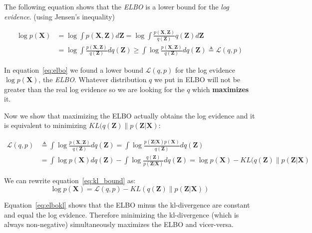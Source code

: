 \documentclass[11pt, a4paper]{report}
\theoremstyle{plain}
\theoremstyle{definition}
\theoremstyle{remark}
\newcommand{\bv}[1]{\boldsymbol{#1}}
\begin{document}
The following equation shows that the \emph{ELBO} is a lower bound for the \emph{log
evidence}.
(using Jensen's inequality)

\begin{equation}
\label{eq:elbo}
\begin{aligned}
\log p(\bv{X}) &= \log \int p(\bv{X},\bv{Z}) d\bv{Z} 
= \log \int \frac{p(\bv{X},\bv{Z})}{q(\bv{Z})} q(\bv{Z})d\bv{Z} \\
&= \log \int \frac{p(\bv{X},\bv{Z})}{q(\bv{Z})}dq(\bv{Z}) 
\geq \int \log \frac{p(\bv{X},\bv{Z})}{q(\bv{Z})}dq(\bv{Z}) 
\triangleq \mathcal{L}(q,p)
\end{aligned}
\end{equation}

In equation~\ref{eq:elbo} we found a lower bound $\mathcal{L}(q,p)$ for the log
evidence $\log p(\bv{X})$, the \emph{ELBO}.
Whatever distribution $q$ we put in ELBO will not be
greater than the real log evidence so we are looking for the $q$ which
\textbf{maximizes} it.

Now we show that maximizing the ELBO actually obtains the log evidence and it is
equivalent to minimizing $KL(q(\bv{Z}) \| p(\bv{Z}|\bv{X})$:

\begin{equation}\label{eq:kl_bound}
\begin{aligned}
\mathcal{L}(q,p) &\triangleq \int \log \frac{p(\bv{X},\bv{Z})}{q(\bv{Z})} d
q(\bv{Z})
= \int \log \frac{p(\bv{Z}|\bv{X})p(\bv{X})}{q(\bv{Z})} d q(\bv{Z}) \\
&= \int \log p(\bv{X}) dq(\bv{Z}) - \int \log \frac{q(\bv{Z})}{p(\bv{Z}|\bv{X})}
dq(\bv{Z}) 
= \log p(\bv{X}) - KL(q(\bv{Z}) \| p(\bv{Z}|\bv{X})
\end{aligned}
\end{equation}

We can rewrite equation~\ref{eq:kl_bound} as:
\begin{equation}\label{eq:elbokl}
\log p(\bv{X}) = \mathcal{L}(q,p) - KL(q(\bv{Z}) \| p(\bv{Z}|\bv{X}))
\end{equation}

Equation~\ref{eq:elbokl} shows that the ELBO minus the kl-divergence are constant
and equal the log evidence. Therefore minimizing the kl-divergence (which is
always non-negative) simultaneously maximizes the ELBO and vicer-versa.

%
\end{document}
